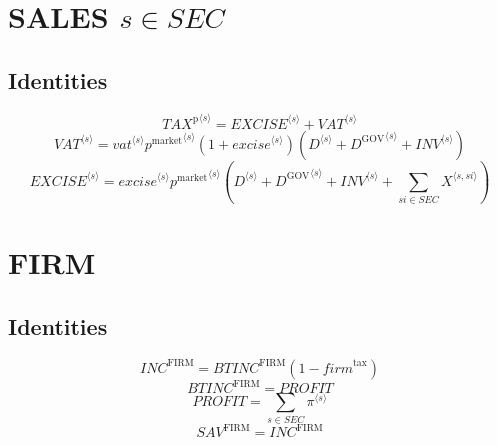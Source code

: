 \section{SALES $s\in {S\!E\!C}$}

\subsection{Identities}

\begin{equation}
{{T\!A\!X}^{\mathrm{p}}}^{\langle s\rangle} = {{E\!X\!C\!I\!S\!E}}^{\langle s\rangle} + {{V\!A\!T}}^{\langle s\rangle}
\end{equation}
\begin{equation}
{{V\!A\!T}}^{\langle s\rangle} = {{{v\!a\!t}}^{\langle s\rangle}} {{p^{\mathrm{market}}}^{\langle s\rangle}} \left(1 + {{e\!x\!c\!i\!s\!e}}^{\langle s\rangle}\right) \left({D}^{\langle s\rangle} + {D^{\mathrm{GOV}}}^{\langle s\rangle} + {{I\!N\!V}}^{\langle s\rangle}\right)
\end{equation}
\begin{equation}
{{E\!X\!C\!I\!S\!E}}^{\langle s\rangle} = {{{e\!x\!c\!i\!s\!e}}^{\langle s\rangle}} {{p^{\mathrm{market}}}^{\langle s\rangle}} \left({D}^{\langle s\rangle} + {D^{\mathrm{GOV}}}^{\langle s\rangle} + {{I\!N\!V}}^{\langle s\rangle} + \sum_{{s\!i}\in {S\!E\!C}} {X}^{\langle s,{s\!i}\rangle}\right)
\end{equation}




\section{FIRM}

\subsection{Identities}

\begin{equation}
{I\!N\!C}^{\mathrm{FIRM}} = {{B\!T\!I\!N\!C}^{\mathrm{FIRM}}} \left(1 - {f\!i\!r\!m}^{\mathrm{tax}}\right)
\end{equation}
\begin{equation}
{B\!T\!I\!N\!C}^{\mathrm{FIRM}} = {P\!R\!O\!F\!I\!T}
\end{equation}
\begin{equation}
{P\!R\!O\!F\!I\!T} = \sum_{s\in {S\!E\!C}} {\pi}^{\langle s\rangle}
\end{equation}
\begin{equation}
{S\!A\!V}^{\mathrm{FIRM}} = {I\!N\!C}^{\mathrm{FIRM}}
\end{equation}




